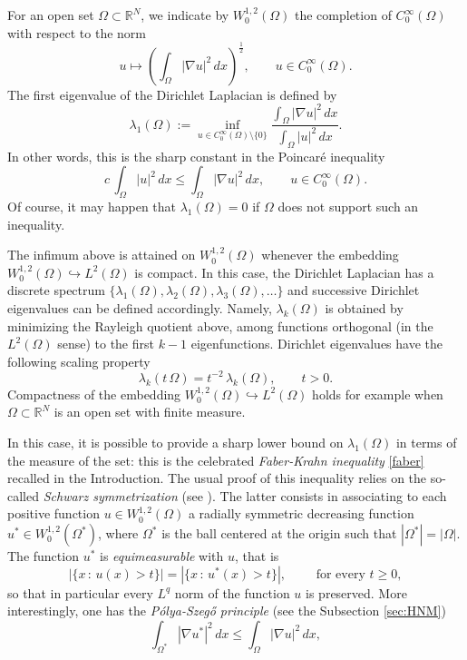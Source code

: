 \documentclass{amsart}
\theoremstyle{definition}
\numberwithin{equation}{section}
\begin{document}
 For an open set $\Omega\subset\mathbb{R}^N$, we indicate by $W^{1,2}_0(\Omega)$ the completion of $C^\infty_0(\Omega)$ with respect to the norm
\[
 u\mapsto \left(\int_\Omega |\nabla u|^2\,dx\right)^\frac{1}{2},\qquad u\in C^\infty_0(\Omega).
\] 
The first eigenvalue of the Dirichlet Laplacian is defined by
\[
\lambda_1(\Omega):=\inf_{u\in C^\infty_0(\Omega)\setminus\{0\}} \frac{\displaystyle\int_\Omega |\nabla u|^2\, dx}{\displaystyle\int_\Omega |u|^2\, dx}.
\] 
In other words, this is the sharp constant in the Poincar\'e inequality
\[
c\,\int_{\Omega} |u|^2\,dx\le \int_\Omega |\nabla u|^2\,dx,\qquad u\in C^\infty_0(\Omega).
\]
Of course, it may happen that $\lambda_1(\Omega)=0$ if $\Omega$ does not support such an inequality.
\par
The infimum above is attained on $W^{1,2}_0(\Omega)$ whenever the embedding $W^{1,2}_0(\Omega)\hookrightarrow L^2(\Omega)$ is compact. In this case, the Dirichlet Laplacian has a discrete spectrum $\{\lambda_1(\Omega),\lambda_2(\Omega),\lambda_3(\Omega),\dots\}$ and
successive Dirichlet eigenvalues can be defined accordingly. Namely, $\lambda_k(\Omega)$ is obtained by minimizing the Rayleigh quotient above, among functions orthogonal (in the $L^2(\Omega)$ sense) to the first $k-1$ eigenfunctions. 
Dirichlet eigenvalues have the following scaling property
\[
\lambda_k(t\,\Omega)=t^{-2}\, \lambda_k(\Omega),\qquad t>0.
\]
Compactness of the embedding $W^{1,2}_0(\Omega)\hookrightarrow L^2(\Omega)$ holds for example when $\Omega\subset\mathbb{R}^N$ is an open set with finite measure. 
\par
In this case, it is possible to provide a sharp lower bound on $\lambda_1(\Omega)$ in terms of the measure of the set: this is the celebrated {\it Faber-Krahn inequality} \eqref{faber} recalled in the Introduction. The usual proof of  this inequality relies on the so-called {\it Schwarz symmetrization} (see \cite[Chapter 2]{MR2251558}). The latter consists in associating to each positive function $u\in W^{1,2}_0(\Omega)$ a radially symmetric decreasing function $u^*\in W^{1,2}_0(\Omega^*)$, where $\Omega^*$ is the ball centered at the origin such that $|\Omega^*|=|\Omega|$. The function $u^*$ is {\it equimeasurable} with $u$, that is
\[
|\{x\, :\, u(x)>t\}|=|\{x\, :\, u^*(x)>t\}|,\qquad \mbox{ for every } t\ge 0,
\]
so that in particular every $L^q$ norm of the function $u$ is preserved.
More interestingly, one has the {\it P\'olya-Szeg\H{o} principle} (see the Subsection \ref{sec:HNM})
\begin{equation}
\label{PS}
\int_{\Omega^*} |\nabla u^*|^2\, dx\le \int_\Omega |\nabla u|^2\, dx,
\end{equation}
\end{document}
